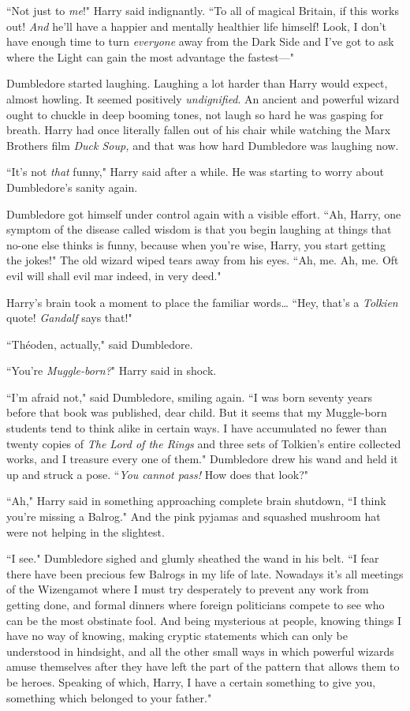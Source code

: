 ``Not just to \emph{me}!" Harry said indignantly. ``To all of magical Britain, if this works out! \emph{And} he'll have a happier and mentally healthier life himself! Look, I don't have enough time to turn \emph{everyone} away from the Dark Side and I've got to ask where the Light can gain the most advantage the fastest—"

Dumbledore started laughing. Laughing a lot harder than Harry would expect, almost howling. It seemed positively \emph{undignified}. An ancient and powerful wizard ought to chuckle in deep booming tones, not laugh so hard he was gasping for breath. Harry had once literally fallen out of his chair while watching the Marx Brothers film \emph{Duck Soup,} and that was how hard Dumbledore was laughing now.

``It's not \emph{that} funny," Harry said after a while. He was starting to worry about Dumbledore's sanity again.

Dumbledore got himself under control again with a visible effort. ``Ah, Harry, one symptom of the disease called wisdom is that you begin laughing at things that no-one else thinks is funny, because when you're wise, Harry, you start getting the jokes!" The old wizard wiped tears away from his eyes. ``Ah, me. Ah, me. Oft evil will shall evil mar indeed, in very deed."

Harry's brain took a moment to place the familiar words{\ldots} ``Hey, that's a \emph{Tolkien} quote! \emph{Gandalf} says that!"

``Théoden, actually," said Dumbledore.

``You're \emph{Muggle-born?}" Harry said in shock.

``I'm afraid not," said Dumbledore, smiling again. ``I was born seventy years before that book was published, dear child. But it seems that my Muggle-born students tend to think alike in certain ways. I have accumulated no fewer than twenty copies of \emph{The Lord of the Rings} and three sets of Tolkien's entire collected works, and I treasure every one of them." Dumbledore drew his wand and held it up and struck a pose. ``\emph{You cannot pass!} How does that look?"

``Ah," Harry said in something approaching complete brain shutdown, ``I think you're missing a Balrog." And the pink pyjamas and squashed mushroom hat were not helping in the slightest.

``I see." Dumbledore sighed and glumly sheathed the wand in his belt. ``I fear there have been precious few Balrogs in my life of late. Nowadays it's all meetings of the Wizengamot where I must try desperately to prevent any work from getting done, and formal dinners where foreign politicians compete to see who can be the most obstinate fool. And being mysterious at people, knowing things I have no way of knowing, making cryptic statements which can only be understood in hindsight, and all the other small ways in which powerful wizards amuse themselves after they have left the part of the pattern that allows them to be heroes. Speaking of which, Harry, I have a certain something to give you, something which belonged to your father."


